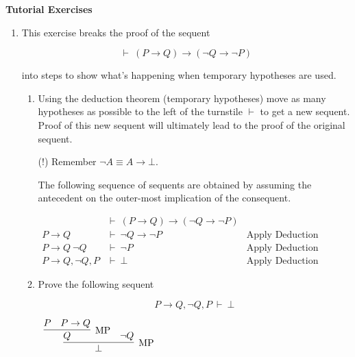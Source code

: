 \documentclass[11pt]{report}
\begin{document}
\newpage
{\bf Tutorial Exercises}
\begin{enumerate}

	\item This exercise breaks the proof of the sequent 
	
	$$\vdash \ (P \to Q) \to (\lnot Q \to \lnot P)$$

	into steps to show what's happening when temporary hypotheses are used. 

	\begin{enumerate}

		\item Using the deduction theorem (temporary hypotheses) move as many hypotheses as possible to the left of the turnstile $\vdash$ to get a new sequent. Proof of this new sequent will ultimately lead to the proof of the original sequent. 
		
		(!) Remember $\lnot A \equiv A \to \bot$.

		\hspace{0.2cm}{\bf Solution}

		The following sequence of sequents are obtained by assuming the antecedent on the outer-most implication of the consequent. 

		\begin{center}
			\begin{align*}
				&\vdash \ (P \to Q) \to (\lnot Q \to \lnot P) & \\
				P \to Q \ &\vdash \ \lnot Q \to \lnot P & \text{Apply Deduction Theorem}\\
				P \to Q \ \lnot Q \ &\vdash \ \lnot P & \text{Apply Deduction Theorem}\\
				P \to Q, \lnot Q, P &\vdash \ \bot & \text{Apply Deduction Theorem}
			\end{align*}
		\end{center}

		\item Prove the following sequent 
		
		$$ P \to Q, \lnot Q, P \ \vdash \ \bot$$

		\hspace{0.2cm}{\bf Solution}

		\begin{mdframed}
			\begin{center}
				$\begin{array}{c}
					\infer[\MP]{\bot}
						{\infer[\MP]{Q}{P & P \to Q} & \lnot Q}
				\end{array}$
			\end{center}
		\end{mdframed}



\end{enumerate}
\end{enumerate}
\end{document}
